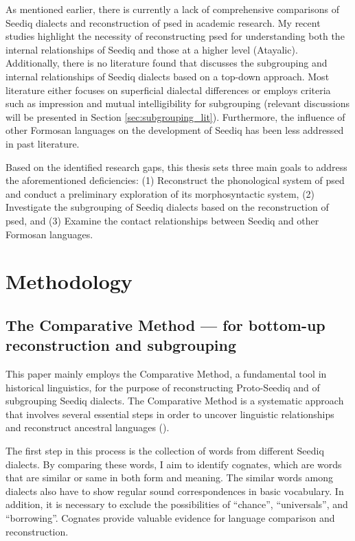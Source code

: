 As mentioned earlier, there is currently a lack of comprehensive comparisons of Seediq dialects and reconstruction of \acl{psed} in academic research. My recent studies highlight the necessity of reconstructing \acl{psed} for understanding both the internal relationships of Seediq and those at a higher level (Atayalic). Additionally, there is no literature found that discusses the subgrouping and internal relationships of Seediq dialects based on a top-down approach. Most literature either focuses on superficial dialectal differences or employs criteria such as impression and mutual intelligibility for subgrouping (relevant discussions will be presented in Section \ref{sec:subgrouping_lit}). Furthermore, the influence of other Formosan languages on the development of Seediq has been less addressed in past literature.

Based on the identified research gaps, this thesis sets three main goals to address the aforementioned deficiencies: (1) Reconstruct the phonological system of \acl{psed} and conduct a preliminary exploration of its morphosyntactic system, (2) Investigate the subgrouping of Seediq dialects based on the reconstruction of \acl{psed}, and (3) Examine the contact relationships between Seediq and other Formosan languages.


\section{Methodology}\label{sec:methodology}

\subsection{The Comparative Method --- for bottom-up reconstruction and subgrouping}

This paper mainly employs the Comparative Method, a fundamental tool in historical linguistics, for the purpose of reconstructing Proto-Seediq and of subgrouping Seediq dialects. The Comparative Method is a systematic approach that involves several essential steps in order to uncover linguistic relationships and reconstruct ancestral languages (\cite{fox1995linguistic}).

The first step in this process is the collection of words from different Seediq dialects. By comparing these words, I aim to identify cognates, which are words that are similar or same in both form and meaning. The similar words among dialects also have to show regular sound correspondences in basic vocabulary. In addition, it is necessary to exclude the possibilities of ``chance'', ``universals'', and ``borrowing''. Cognates provide valuable evidence for language comparison and reconstruction.

